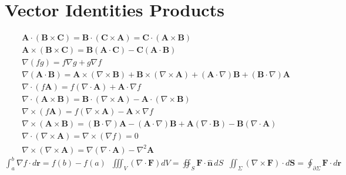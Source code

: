 \section*{Vector Identities Products}
\begin{align*}
&\mathbf{A} \cdot (\mathbf{B} \times \mathbf{C}) = \mathbf{B} \cdot (\mathbf{C} \times \mathbf{A}) = \mathbf{C} \cdot (\mathbf{A} \times \mathbf{B}) \\
&\mathbf{A} \times (\mathbf{B} \times \mathbf{C}) = \mathbf{B}(\mathbf{A} \cdot \mathbf{C}) - \mathbf{C}(\mathbf{A} \cdot \mathbf{B}) \\
&\nabla(fg) = f\nabla g + g\nabla f \\
&\nabla(\mathbf{A} \cdot \mathbf{B}) = \mathbf{A} \times (\nabla \times \mathbf{B}) + \mathbf{B} \times (\nabla \times \mathbf{A}) + (\mathbf{A} \cdot \nabla)\mathbf{B} + (\mathbf{B} \cdot \nabla)\mathbf{A} \\
&\nabla \cdot (f\mathbf{A}) = f(\nabla \cdot \mathbf{A}) + \mathbf{A} \cdot \nabla f \\
&\nabla \cdot (\mathbf{A} \times \mathbf{B}) = \mathbf{B} \cdot (\nabla \times \mathbf{A}) - \mathbf{A} \cdot (\nabla \times \mathbf{B}) \\
&\nabla \times (f\mathbf{A}) = f(\nabla \times \mathbf{A}) - \mathbf{A} \times \nabla f \\
&\nabla \times (\mathbf{A} \times \mathbf{B}) = (\mathbf{B} \cdot \nabla)\mathbf{A} - (\mathbf{A} \cdot \nabla)\mathbf{B} + \mathbf{A}(\nabla \cdot \mathbf{B}) - \mathbf{B}(\nabla \cdot \mathbf{A}) \\
&\nabla \cdot (\nabla \times \mathbf{A}) = \nabla \times (\nabla f) = 0 \\
&\nabla \times (\nabla \times \mathbf{A}) = \nabla (\nabla \cdot \mathbf{A}) - \nabla^2 \mathbf{A}
\end{align*}
$\textstyle \int_a^b \nabla f \cdot d\mathbf{r} = f(b){-}f(a) \;\;
\iiint_V (\nabla{\cdot}\mathbf{F}) dV = \oiint_S \mathbf{F}{\cdot}\hat{\mathbf{n}}\,dS \;\;
\iint_\Sigma (\nabla{\times}\mathbf{F}){\cdot}d\mathbf{S} = \oint_{\partial\Sigma} \mathbf{F}{\cdot}d\mathbf{r}$

